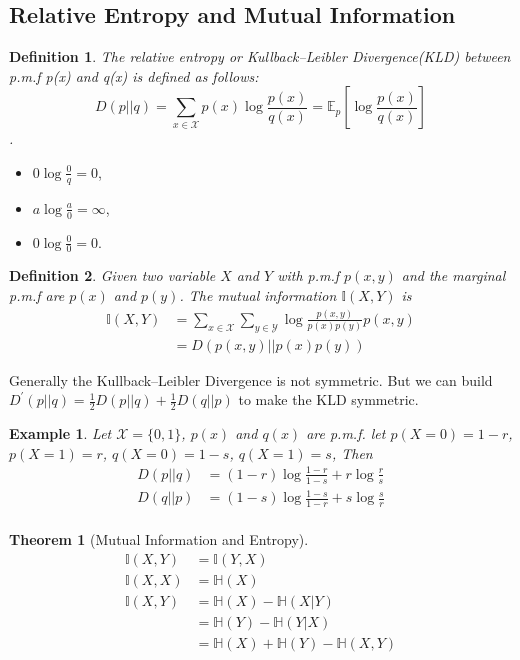 \documentclass[11pt]{article}
\newtheorem{theorem}{Theorem}[section]
\newtheorem{definition}{Definition}[section]
\newtheorem{example}{Example}[section]
\begin{document}
\subsection{Relative Entropy and Mutual Information}
\begin{definition}
The relative entropy or Kullback–Leibler Divergence(KLD) between p.m.f p(x) and q(x) is defined as follows:
$$D(p||q)=\sum\limits_{x \in \mathcal{X}}p(x)\log \frac{p(x)}{q(x)}=\mathbb{E}_{p}\left[\log \frac{p(x)}{q(x)}\right]$$.
\end{definition}
\begin{itemize}
\item $0\log \frac{0}{q}=0$,
\item $a\log \frac{a}{0}=\infty$,
\item $0\log \frac{0}{0}=0$.
\end{itemize}
\begin{definition}
Given two variable $X$ and $Y$ with p.m.f $p(x,y)$ and the marginal p.m.f are $p(x)$ and $p(y)$. The mutual information $\mathbb{I}(X,Y)$ is
\[
\begin{split}
\mathbb{I}(X,Y) &= \sum\limits_{x \in \mathcal{X}}\sum\limits_{y \in \mathcal{Y}}\log \frac{p(x,y)}{p(x)p(y)}p(x,y) \\
&= D(p(x,y)||p(x)p(y))
\end{split}
\]
\end{definition}
Generally the Kullback–Leibler Divergence is not symmetric. But we can build $D^{'}(p||q)=\frac{1}{2}D(p||q)+\frac{1}{2}D(q||p)$ to make the KLD symmetric.
\begin{example}
Let $\mathcal{X}=\{0,1\}$, $p(x)$ and $q(x)$ are p.m.f. let $p(X=0)=1-r$, $p(X=1)=r$, $q(X=0)=1-s$, $q(X=1)=s$, Then
\[
\begin{split}
D(p||q) &=(1-r)\log \frac{1-r}{1-s}+r\log \frac{r}{s} \\
D(q||p) &=(1-s)\log \frac{1-s}{1-r}+s\log \frac{s}{r} \\
\end{split}
\]
\end{example}
\begin{theorem}[Mutual Information and Entropy]
\[
\begin{split}
\mathbb{I}(X,Y) &=\mathbb{I}(Y,X)\\
\mathbb{I}(X,X) &=\mathbb{H}(X)\\
\mathbb{I}(X,Y) &=\mathbb{H}(X)-\mathbb{H}(X|Y)\\
                &=\mathbb{H}(Y)-\mathbb{H}(Y|X) \\
                &=\mathbb{H}(X)+\mathbb{H}(Y)-\mathbb{H}(X,Y)\\
\end{split}
\]
\end{theorem}
\end{document}
